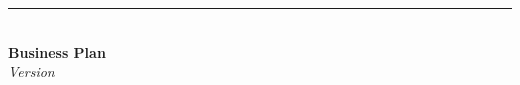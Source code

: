 \begin{titlepage} 	
	\raggedleft %
	\rule{1pt}{\textheight}
	\hspace{0.05\textwidth} 
	\parbox[b]{0.75\textwidth}{ 		
		{\Large\bfseries \companyFullName{}\\[0.5\baselineskip] Business Plan  }\\[2\baselineskip] 
		{\large\textit{Version \version{}}}\\[4\baselineskip] %
		{\Large\textsc{\yourName{}}} %
		
		\vspace{0.5\textheight} %
		
		{\noindent %
			\raggedright
			\companyName{}\\
			\companyAddress{}\\
			\companyPhone{}\\
			\companyWebsite{}\\
			\companyEmail{}			
		}\\[\baselineskip] %
	}

\end{titlepage}